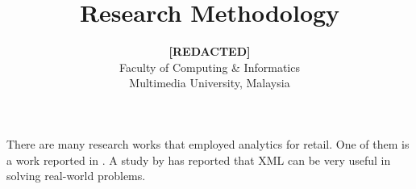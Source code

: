 \documentclass[a4paper]{article}
\begin{document}
\title{Research Methodology}
\author{\textbf{[REDACTED]}\\
Faculty of Computing \& Informatics\\
Multimedia University, Malaysia}
\date{}

\maketitle
There are many research works that employed analytics for retail. One of them is a work reported in . A study by  has reported that XML can be very useful in solving real-world problems.


{}
\end{document}
